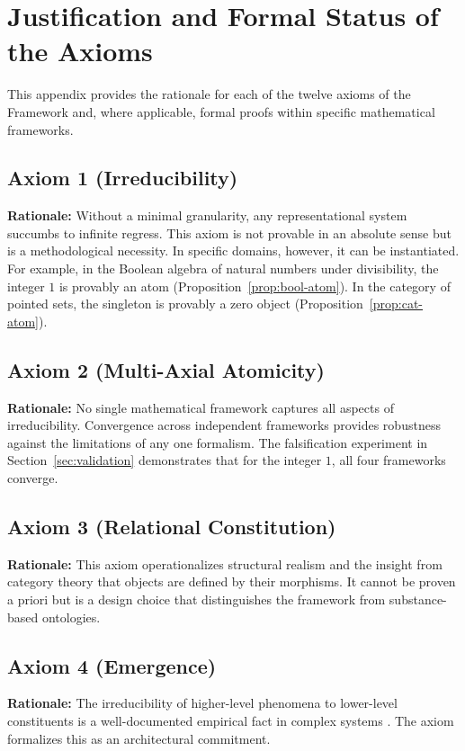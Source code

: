 \section{Justification and Formal Status of the Axioms}
\label{app:axiom_justifications}

This appendix provides the rationale for each of the twelve axioms of the \Apeiron{} Framework and, where applicable, formal proofs within specific mathematical frameworks.

\subsection*{Axiom 1 (Irreducibility)}
\textbf{Rationale:} Without a minimal granularity, any representational system succumbs to infinite regress. This axiom is not provable in an absolute sense but is a methodological necessity. In specific domains, however, it can be instantiated. For example, in the Boolean algebra of natural numbers under divisibility, the integer $1$ is provably an atom (Proposition~\ref{prop:bool-atom}). In the category of pointed sets, the singleton is provably a zero object (Proposition~\ref{prop:cat-atom}).

\subsection*{Axiom 2 (Multi-Axial Atomicity)}
\textbf{Rationale:} No single mathematical framework captures all aspects of irreducibility. Convergence across independent frameworks provides robustness against the limitations of any one formalism. The falsification experiment in Section~\ref{sec:validation} demonstrates that for the integer $1$, all four frameworks converge.

\subsection*{Axiom 3 (Relational Constitution)}
\textbf{Rationale:} This axiom operationalizes structural realism and the insight from category theory that objects are defined by their morphisms. It cannot be proven a priori but is a design choice that distinguishes the framework from substance-based ontologies.

\subsection*{Axiom 4 (Emergence)}
\textbf{Rationale:} The irreducibility of higher-level phenomena to lower-level constituents is a well-documented empirical fact in complex systems \cite{bedau1997, mitchell2009}. The axiom formalizes this as an architectural commitment.

